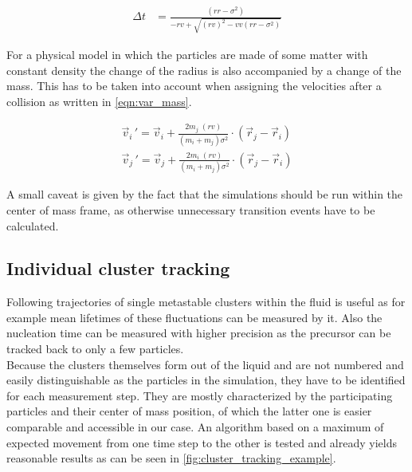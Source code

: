 \begin{align}
\label{eqn:collision_prediction2}
\Delta t &= \frac{(rr - \sigma^2 )}{ - rv + \sqrt{ (rv)^2  - vv (rr - \sigma^2 )}}
\end{align} 

For a physical model in which the particles are made of some matter with constant density the change of the radius is also accompanied by a change of the mass. This has to be taken into account when assigning the velocities after a collision as written in \autoref{eqn:var_mass}.

\begin{align}
\label{eqn:var_mass}
\vec{v}_i{\,'} = \vec{v}_i + \frac{2 m_j \; (rv)}{(m_i + m_j) \sigma^2} \cdot (\vec{r}_j - \vec{r}_i) \nonumber \\
\vec{v}_j{\,'} = \vec{v}_j + \frac{2 m_i \; (rv)}{(m_i + m_j) \sigma^2} \cdot (\vec{r}_j - \vec{r}_i)
\end{align}

A small caveat is given by the fact that the simulations should be run within the center of mass frame, as otherwise unnecessary transition events have to be calculated.

\subsection{Individual cluster tracking}
\label{sec:tracking}
Following trajectories of single metastable clusters within the fluid is useful as for example mean lifetimes of these fluctuations can be measured by it. Also the nucleation time can be measured with higher precision as the precursor can be tracked back to only a few particles.\\ 
Because the clusters themselves form out of the liquid and are not numbered and easily distinguishable as the particles in the simulation, they have to be identified for each measurement step. They are mostly characterized by the participating particles and their center of mass position, of which the latter one is easier comparable and accessible in our case. An algorithm based on a maximum of expected movement from one time step to the other is tested and already yields reasonable results as can be seen in \autoref{fig:cluster_tracking_example}.

